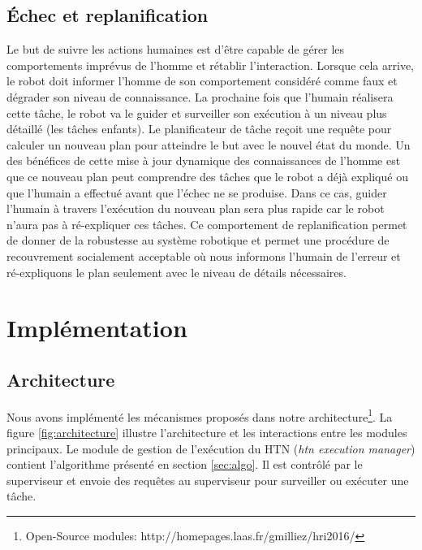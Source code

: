 \documentclass[a4paper,11pt,twoside]{StyleThese}
\begin{document}
\subsection{Échec et replanification}

Le but de suivre les actions humaines est d'être capable de gérer les comportements imprévus de l'homme et rétablir l'interaction. Lorsque cela arrive, le robot doit informer l'homme de son comportement considéré comme faux et dégrader son niveau de connaissance. La prochaine fois que l'humain réalisera cette tâche, le robot va le guider et surveiller son exécution à un niveau plus détaillé (les tâches enfants).
Le planificateur de tâche reçoit une requête pour calculer un nouveau plan pour atteindre le but avec le nouvel état du monde. 
Un des bénéfices de cette mise à jour dynamique des connaissances de l'homme est que ce nouveau plan peut comprendre des tâches que le robot a déjà expliqué ou que l'humain a effectué avant que l'échec ne se produise. Dans ce cas, guider l'humain à travers l'exécution du nouveau plan sera plus rapide car le robot n'aura pas à ré-expliquer ces tâches.
Ce comportement de replanification permet de donner de la robustesse au système robotique et permet une procédure de recouvrement socialement acceptable où nous informons l'humain de l'erreur et ré-expliquons le plan seulement avec le niveau de détails nécessaires.





\section{Implémentation}
\subsection{Architecture}
Nous avons implémenté les mécanismes proposés dans notre architecture\footnote{Open-Source modules: http://homepages.laas.fr/gmilliez/hri2016/}. La figure \ref{fig:architecture} illustre l'architecture et les interactions entre les modules principaux.
Le module de gestion de l'exécution du HTN (\textit{htn execution manager}) contient l'algorithme présenté en section \ref{sec:algo}.
Il est contrôlé par le superviseur et envoie des requêtes au superviseur pour surveiller ou exécuter une tâche.
\end{document}
